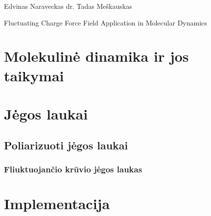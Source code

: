 \documentclass[a4paper,12pt,fleqn,tikz]{article}
\begin{document}
    {Edvinas Naraveckas}
    {}{}{}{}%
    {dr. Tadas Meškauskas}

    \tableofcontents



    \bothabstracts{}%
    {Fluctuating Charge Force Field Application in Molecular Dynamics} %
    {}%


    



    \newpage
    \section{Molekulinė dinamika ir jos taikymai}
    \label{sec:molecular_dynamics_section}
    


    \newpage
    \section{Jėgos laukai}
    \label{sec:force_field}
    


    \subsection{Poliarizuoti jėgos laukai}
    \label{sec:polarized_force_fields}
    


    \subsubsection{Fliuktuojančio krūvio jėgos laukas}
    \label{sec:fluctuating_charge}
    



    \newpage
    \section{Implementacija}
    \label{sec:implementation}
    



    

    


\end{document}
